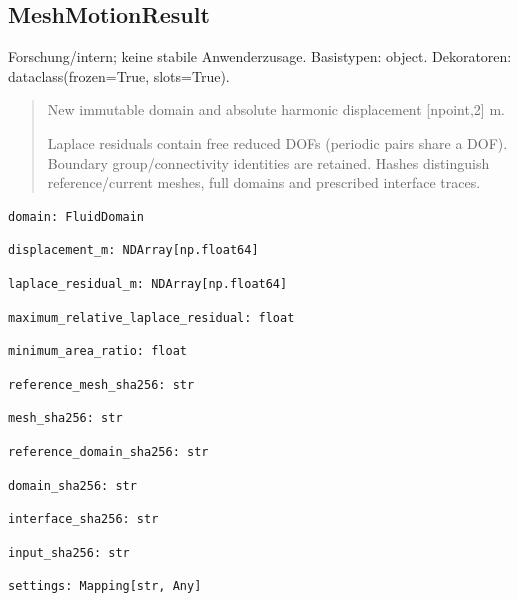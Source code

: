 \subsection{MeshMotionResult}
Forschung/intern; keine stabile Anwenderzusage.
Basistypen: object. Dekoratoren: dataclass(frozen=True, slots=True).
\begin{quote}
New immutable domain and absolute harmonic displacement [npoint,2] m.\par Laplace residuals contain free reduced DOFs (periodic pairs share a DOF). Boundary group/connectivity identities are retained. Hashes distinguish reference/current meshes, full domains and prescribed interface traces.
\end{quote}
\begin{lstlisting}
domain: FluidDomain
\end{lstlisting}
\begin{lstlisting}
displacement_m: NDArray[np.float64]
\end{lstlisting}
\begin{lstlisting}
laplace_residual_m: NDArray[np.float64]
\end{lstlisting}
\begin{lstlisting}
maximum_relative_laplace_residual: float
\end{lstlisting}
\begin{lstlisting}
minimum_area_ratio: float
\end{lstlisting}
\begin{lstlisting}
reference_mesh_sha256: str
\end{lstlisting}
\begin{lstlisting}
mesh_sha256: str
\end{lstlisting}
\begin{lstlisting}
reference_domain_sha256: str
\end{lstlisting}
\begin{lstlisting}
domain_sha256: str
\end{lstlisting}
\begin{lstlisting}
interface_sha256: str
\end{lstlisting}
\begin{lstlisting}
input_sha256: str
\end{lstlisting}
\begin{lstlisting}
settings: Mapping[str, Any]
\end{lstlisting}
